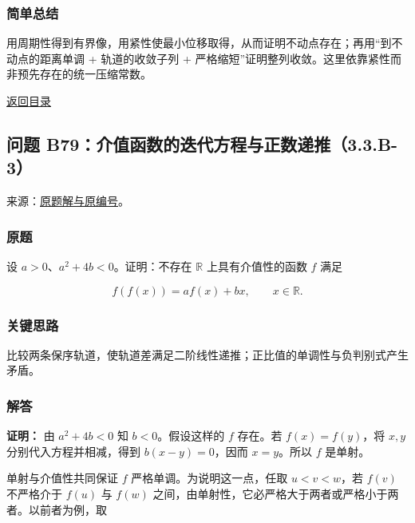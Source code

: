 \documentclass[11pt,a4paper]{article}
\begin{document}
\subsubsection{简单总结}\label{ux7b80ux5355ux603bux7ed3-11}

用周期性得到有界像，用紧性使最小位移取得，从而证明不动点存在；再用``到不动点的距离单调
+ 轨道的收敛子列 +
严格缩短''证明整列收敛。这里依靠紧性而非预先存在的统一压缩常数。

\noindent\hyperref[contents]{返回目录}

\subsection{问题
B79：介值函数的迭代方程与正数递推（3.3.B-3）}\label{ux95eeux9898-b79ux4ecbux503cux51fdux6570ux7684ux8fedux4ee3ux65b9ux7a0bux4e0eux6b63ux6570ux9012ux63a83.3.b-3}

来源：\href{https://zj139.github.io/math-notes/problems/026454abe0373d4f9174aa05/\#问题-b79}{原题解与原编号}。

\subsubsection{原题}\label{ux539fux9898-12}

设 \(a>0\)、\(a^2+4b<0\)。证明：不存在 \(\mathbb R\) 上具有介值性的函数
\(f\) 满足

\[
f(f(x))=af(x)+bx,\qquad x\in\mathbb R.
\]

\subsubsection{关键思路}\label{ux5173ux952eux601dux8def-12}

比较两条保序轨道，使轨道差满足二阶线性递推；正比值的单调性与负判别式产生矛盾。

\subsubsection{解答}\label{ux89e3ux7b54-12}

\textbf{证明：} 由 \(a^2+4b<0\) 知 \(b<0\)。假设这样的 \(f\) 存在。若
\(f(x)=f(y)\)，将 \(x,y\) 分别代入方程并相减，得到 \(b(x-y)=0\)，因而
\(x=y\)。所以 \(f\) 是单射。

单射与介值性共同保证 \(f\) 严格单调。为说明这一点，任取 \(u<v<w\)，若
\(f(v)\) 不严格介于 \(f(u)\) 与 \(f(w)\)
之间，由单射性，它必严格大于两者或严格小于两者。以前者为例，取
\end{document}

